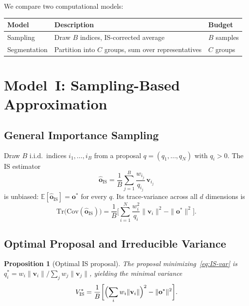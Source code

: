\documentclass[11pt,a4paper]{article}
\newtheorem{proposition}[theorem]{Proposition}
\theoremstyle{definition}
\newcommand{\vv}{\mathbf{v}}
\newcommand{\oo}{\mathbf{o}}
\newcommand{\Cov}{\mathrm{Cov}}
\newcommand{\Tr}{\mathrm{Tr}}
\begin{document}
We compare two computational models:

\begin{center}
\begin{tabular}{lll}
\toprule
\textbf{Model} & \textbf{Description} & \textbf{Budget}\\
\midrule
Sampling      & Draw $B$ indices, IS-corrected average & $B$ samples\\
Segmentation  & Partition into $C$ groups, sum over representatives & $C$ groups\\
\bottomrule
\end{tabular}
\end{center}

\section{Model~I: Sampling-Based Approximation}\label{sec:sampling}

\subsection{General Importance Sampling}

Draw $B$ i.i.d.\ indices $i_1,\dots,i_B$ from a proposal $q=(q_1,\dots,q_N)$
with $q_i>0$.  The IS estimator
\begin{equation}\label{eq:IS}
  \hat{\oo}_{\mathrm{IS}}
  = \frac{1}{B}\sum_{j=1}^{B}\frac{w_{i_j}}{q_{i_j}}\,\vv_{i_j}
\end{equation}
is unbiased: $\mathbb{E}[\hat{\oo}_{\mathrm{IS}}]=\oo^{*}$ for every $q$.
Its trace-variance across all $d$ dimensions is
\begin{equation}\label{eq:IS-var}
  \Tr\bigl(\Cov(\hat{\oo}_{\mathrm{IS}})\bigr)
  = \frac{1}{B}\biggl[\sum_{i=1}^{N}\frac{w_i^{2}}{q_i}\|\vv_i\|^{2}
    - \|\oo^{*}\|^{2}\biggr].
\end{equation}

\subsection{Optimal Proposal and Irreducible Variance}

\begin{proposition}[Optimal IS proposal]\label{prop:opt-IS}
The proposal minimizing~\eqref{eq:IS-var} is
$q_i^{*}=w_i\|\vv_i\|\big/\!\sum_{j}w_j\|\vv_j\|$,
yielding the minimal variance
\begin{equation}\label{eq:Vstar}
  V_{\mathrm{IS}}^{*}
  = \frac{1}{B}\biggl[\Bigl(\sum_{i}w_i\|\vv_i\|\Bigr)^{2}
    - \|\oo^{*}\|^{2}\biggr].
\end{equation}
\end{proposition}
\end{document}
